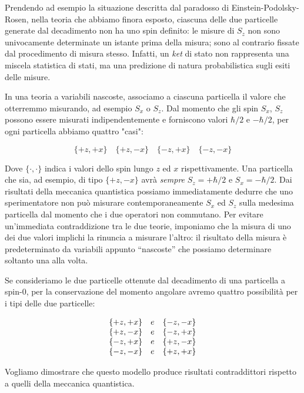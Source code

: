 Prendendo ad esempio la situazione descritta dal paradosso di Einstein-Podolsky-Rosen, nella teoria che abbiamo finora esposto, ciascuna delle due particelle generate dal decadimento non ha uno spin definito: le misure di $S_z$ non sono univocamente determinate un istante prima della misura; sono al contrario fissate dal procedimento di misura stesso. Infatti, un \textit{ket} di stato non rappresenta una miscela statistica di stati, ma una predizione di natura probabilistica sugli esiti delle misure.

In una teoria a variabili nascoste, associamo a ciascuna particella il valore che otterremmo misurando, ad esempio $S_x$ o $S_z$. Dal momento che gli spin $S_x$, $S_z$ possono essere misurati indipendentemente e forniscono valori $\hbar / 2$ e $-\hbar / 2$, per ogni particella abbiamo quattro "casi":

	\begin{equation}
		\{ +z, +x \} \quad \{ +z, -x \} \quad \{ -z, +x \} \quad \{ -z, -x \}
	\end{equation}

Dove $\{ \cdot, \cdot \} $ indica i valori dello spin lungo $z$ ed $x$ rispettivamente. Una particella che sia, ad esempio, di tipo $\{ +z, -x \}$ avr\`a \textit{sempre} $S_z = + \hbar / 2$ e $S_x = - \hbar / 2$. Dai risultati della meccanica quantistica possiamo immediatamente dedurre che uno sperimentatore non pu\`o misurare contemporaneamente $S_x$ ed $S_z$ sulla medesima particella dal momento che i due operatori non commutano. Per evitare un'immediata contraddizione tra le due teorie, imponiamo che la misura di uno dei due valori implichi la rinuncia a misurare l'altro: il risultato della misura \`e predeterminato da variabili appunto ``nascoste'' che possiamo determinare soltanto una alla volta.

Se consideriamo le due particelle ottenute dal decadimento di una particella a spin-0, per la conservazione del momento angolare avremo quattro possibilit\`a per i tipi delle due particelle:

	\begin{equation}
		\begin{array}{c c c}
			\{ +z, +x \} & e & \{ -z, -x \} \\
			\{ +z, -x \} & e & \{ -z, +x \} \\
			\{ -z, +x \} & e & \{ +z, -x \} \\
			\{ -z, -x \} & e & \{ +z, +x \} \\
		\end{array}
	\end{equation}

Vogliamo dimostrare che questo modello produce risultati contraddittori rispetto a quelli della meccanica quantistica.
